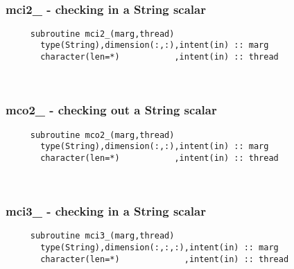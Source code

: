  
\mbox{}\hrulefill\ 
 
  \subsubsection{mci2\_ - checking in a String scalar}

\begin{verbatim} 
     subroutine mci2_(marg,thread)
       type(String),dimension(:,:),intent(in) :: marg
       character(len=*)           ,intent(in) :: thread
 \end{verbatim}%
 
 
\mbox{}\hrulefill\ 
 
  \subsubsection{mco2\_ - checking out a String scalar}

\begin{verbatim} 
     subroutine mco2_(marg,thread)
       type(String),dimension(:,:),intent(in) :: marg
       character(len=*)           ,intent(in) :: thread
 \end{verbatim}%
 
 
\mbox{}\hrulefill\ 

  \subsubsection{mci3\_ - checking in a String scalar}

\begin{verbatim} 
     subroutine mci3_(marg,thread)
       type(String),dimension(:,:,:),intent(in) :: marg
       character(len=*)             ,intent(in) :: thread
 \end{verbatim}%
 

